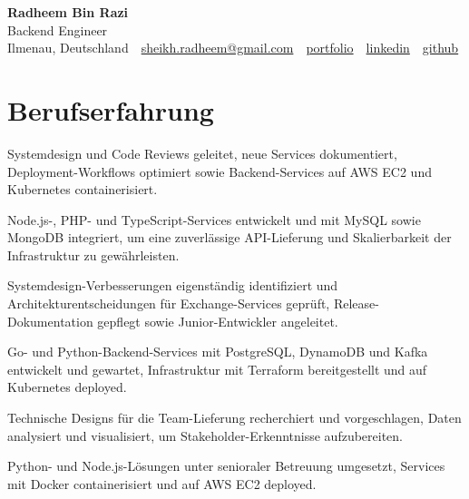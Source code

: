 \documentclass[11pt,a4paper]{resume}
\makeatletter
\newcommand{\Portfolio}{https://radheem.github.io/my-cv}
\newcommand{\PortfolioText}{portfolio}
\newcommand{\GitHub}{https://github.com/radheem}
\newcommand{\LinkedIn}{https://www.linkedin.com/in/radheem-razi}
\newcommand{\Email}{sheikh.radheem@gmail.com}
\makeatother
\begin{document}
\clearpage
{}

\begin{center}
  {\huge\bfseries Radheem Bin Razi}\\[3pt]
  {\large Backend Engineer}\\[6pt]
  \small
  Ilmenau, Deutschland \,\textbar\,
  \href{mailto:\Email}{\Email} \,\textbar\,
  \href{\Portfolio}{\PortfolioText} \,\textbar\,
  \href{\LinkedIn}{linkedin} \,\textbar\,
  \href{\GitHub}{github}
\end{center}
\vspace{2pt}

\section{Berufserfahrung}

\bullets
  \item Systemdesign und Code Reviews geleitet, neue Services dokumentiert, Deployment-Workflows optimiert sowie Backend-Services auf AWS EC2 und Kubernetes containerisiert.
  \item Node.js-, PHP- und TypeScript-Services entwickelt und mit MySQL sowie MongoDB integriert, um eine zuverlässige API-Lieferung und Skalierbarkeit der Infrastruktur zu gewährleisten.
\bulletsend
\vspace{3pt}
\bullets
  \item Systemdesign-Verbesserungen eigenständig identifiziert und Architekturentscheidungen für Exchange-Services geprüft, Release-Dokumentation gepflegt sowie Junior-Entwickler angeleitet.
  \item Go- und Python-Backend-Services mit PostgreSQL, DynamoDB und Kafka entwickelt und gewartet, Infrastruktur mit Terraform bereitgestellt und auf Kubernetes deployed.
\bulletsend
\vspace{3pt}
\bullets
  \item Technische Designs für die Team-Lieferung recherchiert und vorgeschlagen, Daten analysiert und visualisiert, um Stakeholder-Erkenntnisse aufzubereiten.
  \item Python- und Node.js-Lösungen unter senioraler Betreuung umgesetzt, Services mit Docker containerisiert und auf AWS EC2 deployed.
\bulletsend
\vspace{3pt}
\end{document}
